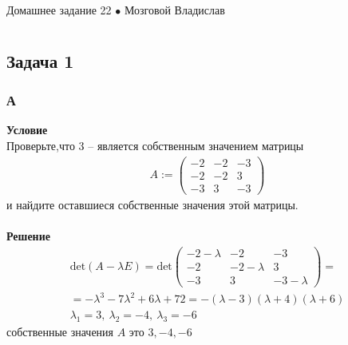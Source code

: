 \newpage
	{\large \hspace{3cm} \begin{center} Домашнее задание 22 $\bullet$ Мозговой Владислав \end{center} }
	\vspace{-1.5ex}
	\hrulefill
	
	\fontsize{12pt}{4.5mm}\selectfont
	\vspace{-3ex}
	\hrulefill
	\newline

	\section*{}
		\subsection*{\textbf{Задача 1}}
		\subsubsection*{\textbf{А}}
		\textbf{Условие}\\
		Проверьте,что 3 – является собственным значением матрицы
		\begin{gather*}
			A := 
			\begin{pmatrix}
				-2 & -2 & -3 \\
				-2 & -2 & 3 \\
				-3 & 3 & -3
			\end{pmatrix}
		\end{gather*}
		и найдите оставшиеся собственные значения этой матрицы.\\
		\\
		\textbf{Решение}\\
		\begin{gather*}
			\text{det}(A-\lambda E) = 
			\text{det}
			\begin{pmatrix}
				-2-\lambda & -2 & -3 \\
				-2 & -2-\lambda & 3 \\
				-3 & 3 & -3-\lambda
			\end{pmatrix}
			=\\=
			-\lambda^3 - 7\lambda^2 + 6\lambda + 72
			=
			-(\lambda - 3)(\lambda + 4)(\lambda + 6)\\
			\lambda_1 = 3,\ \lambda_2 = -4,\ \lambda_3 = -6
		\end{gather*}
		собственные значения $A$ это $3, -4, -6$
		
